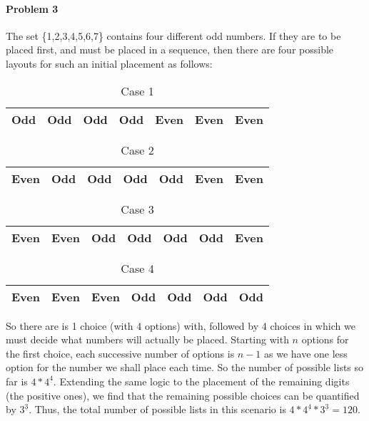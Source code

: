 \documentclass{article}
\newcommand{\fallingfactorial}[1]{%
  ^{\underline{#1}}%
}
\begin{document}
	\paragraph{Problem 3}
	
	The set \{1,2,3,4,5,6,7\} contains four different odd numbers. If they are to be placed first, and 
	must be placed in a sequence, then there are four possible layouts for such an initial placement as follows:
	
	\begin{table} [h!] 
	\centering
		\begin{tabular} { | c | c | c | c | c | c | c | }
		\hline
		Odd & Odd & Odd & Odd & Even & Even & Even\\ 
		\hline
		\end{tabular}
		\caption{Case 1}
	\end{table}
	
	\newpage
	
	\begin{table} [h!] 
	\centering
		\begin{tabular} { | c | c | c | c | c | c | c | }
		\hline
		Even & Odd & Odd & Odd & Odd & Even & Even\\ 
		\hline
		\end{tabular}
		\caption{Case 2}
	\end{table}
	
	\begin{table} [h!] 
	\centering
		\begin{tabular} { | c | c | c | c | c | c | c | }
		\hline
		Even & Even & Odd & Odd & Odd & Odd & Even\\ 
		\hline
		\end{tabular}
		\caption{Case 3}
	\end{table}	
	
	\begin{table} [h!]
	\centering
		\begin{tabular} { | c | c | c | c | c | c | c | }
		\hline
		Even & Even & Even & Odd & Odd & Odd & Odd\\ 
		\hline
		\end{tabular}
		\caption{Case 4}
	\end{table}
	
	So there are is 1 choice (with 4 options) with, followed by 4 choices in which 
	we must decide what numbers will actually be placed. Starting with $n$ options for the first 
	choice, each successive number of options is $n - 1$ as we have one less option for 
	the number we shall place each time. So the number of possible lists so far is 
	$4 * 4\fallingfactorial{4}$. Extending the same logic to the placement of the remaining digits 
	(the positive ones), we find that the remaining possible choices can be 
	quantified by $3\fallingfactorial{3}$. Thus, the total number of possible lists in this scenario is
	$4*4\fallingfactorial{4}*3\fallingfactorial{3} = 120$.
	
\end{document}
